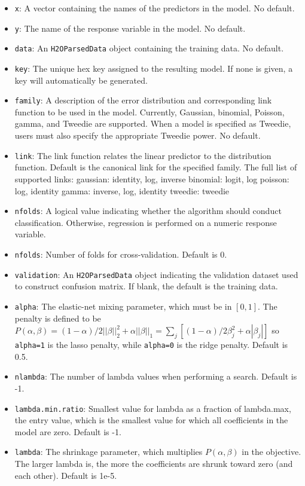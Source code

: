 \documentclass[11pt]{article}
\begin{document}
\begin{itemize}
\item \texttt{x}: A vector containing the names of the predictors in the model. No default.
\item \texttt{y}: The name of the response variable in the model. No default.
\item \texttt{data}: An \texttt{H2OParsedData} object containing the training data. No default.
\item \texttt{key}: The unique hex key assigned to the resulting model. If none is given, a key will automatically be generated.
\item \texttt{family}: A description of the error distribution and corresponding link function to be used in the model. Currently, Gaussian, binomial, Poisson, gamma, and Tweedie are supported. When a model is specified as Tweedie, users must also specify the appropriate Tweedie power. No default.
\item \texttt{link}: The link function relates the linear predictor to the distribution function. Default is the canonical link for the specified family. The full list of supported links: 
	gaussian: identity, log, inverse 
	binomial: logit, log 
	poisson: log, identity
	gamma: inverse, log, identity
	tweedie: tweedie 
\item \texttt{nfolds}: A logical value indicating whether the algorithm should conduct classification. Otherwise, regression is performed on a numeric response variable.
\item \texttt{nfolds}: Number of folds for cross-validation. Default is 0.
\item \texttt{validation}: An \texttt{H2OParsedData} object indicating the validation dataset used to construct confusion matrix. If  blank, the default is the training data.
\item \texttt{alpha}: The elastic-net mixing parameter, which must be in $[0,1]$. The penalty is defined to be $P(\alpha,\beta) = (1-\alpha)/2||\beta||_2^2 + \alpha||\beta||_1 = \sum_j [(1-\alpha)/2 \beta_j^2 + \alpha|\beta_j|] $ so \texttt{alpha=1} is the lasso penalty, while \texttt{alpha=0} is the ridge penalty. Default is 0.5.
\item \texttt{nlambda}: The number of lambda values when performing a search. Default is -1.
\item \texttt{lambda.min.ratio}: Smallest value for lambda as a fraction of lambda.max, the entry value, which is the smallest value for which all coefficients in the model are zero. Default is -1.
\item \texttt{lambda}: The shrinkage parameter, which multiplies $P(\alpha,\beta)$ in the objective. The larger lambda is, the more the coefficients are shrunk toward zero (and each other). Default is 1e-5.

\end{itemize}
\end{document}
